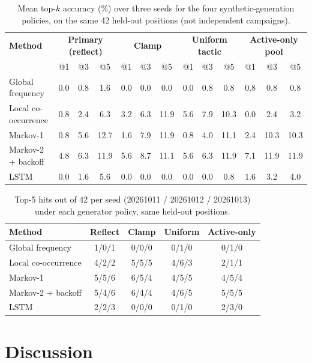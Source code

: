 \documentclass[conference]{IEEEtran}
\begin{document}
\begin{table}[!t]
\caption{Mean top-$k$ accuracy (\%) over three seeds for the four synthetic-generation policies, on the same 42 held-out positions (not independent campaigns).}
\label{tab:sensitivity}
\centering
\scriptsize
\begin{tabular}{|l|ccc|ccc|ccc|ccc|}
\hline
\textbf{Method} & \multicolumn{3}{c|}{\textbf{Primary (reflect)}} & \multicolumn{3}{c|}{\textbf{Clamp}} & \multicolumn{3}{c|}{\textbf{Uniform tactic}} & \multicolumn{3}{c|}{\textbf{Active-only pool}} \\
 & @1 & @3 & @5 & @1 & @3 & @5 & @1 & @3 & @5 & @1 & @3 & @5 \\
\hline
Global frequency & 0.0 & 0.8 & 1.6 & 0.0 & 0.0 & 0.0 & 0.0 & 0.8 & 0.8 & 0.8 & 0.8 & 0.8 \\
Local co-occurrence & 0.8 & 2.4 & 6.3 & 3.2 & 6.3 & 11.9 & 5.6 & 7.9 & 10.3 & 0.0 & 2.4 & 3.2 \\
Markov-1 & 0.8 & 5.6 & 12.7 & 1.6 & 7.9 & 11.9 & 0.8 & 4.0 & 11.1 & 2.4 & 10.3 & 10.3 \\
Markov-2 + backoff & 4.8 & 6.3 & 11.9 & 5.6 & 8.7 & 11.1 & 5.6 & 6.3 & 11.9 & 7.1 & 11.9 & 11.9 \\
LSTM & 0.0 & 1.6 & 5.6 & 0.0 & 0.0 & 0.0 & 0.0 & 0.0 & 0.8 & 1.6 & 3.2 & 4.0 \\
\hline
\end{tabular}
\end{table}

\begin{table}[!t]
\caption{Top-5 hits out of 42 per seed (20261011 / 20261012 / 20261013) under each generator policy, same held-out positions.}
\label{tab:hits}
\centering
\scriptsize
\begin{tabular}{|l|c|c|c|c|}
\hline
\textbf{Method} & \textbf{Reflect} & \textbf{Clamp} & \textbf{Uniform} & \textbf{Active-only} \\
\hline
Global frequency & 1/0/1 & 0/0/0 & 0/1/0 & 0/1/0 \\
Local co-occurrence & 4/2/2 & 5/5/5 & 4/6/3 & 2/1/1 \\
Markov-1 & 5/5/6 & 6/5/4 & 4/5/5 & 4/5/4 \\
Markov-2 + backoff & 5/4/6 & 6/4/4 & 4/6/5 & 5/5/5 \\
LSTM & 2/2/3 & 0/0/0 & 0/1/0 & 2/3/0 \\
\hline
\end{tabular}
\end{table}

\section{Discussion}
\end{document}
